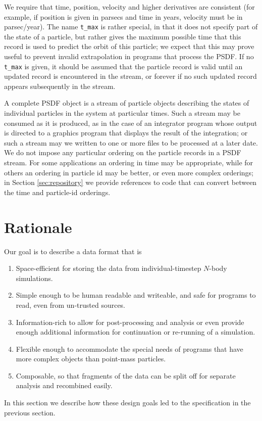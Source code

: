 \documentclass[5p,authoryear]{elsarticle}
\begin{document}
We require that time, position, velocity and higher derivatives are
consistent (for example, if position is given in parsecs and time in
years, velocity must be in parsec/year).  The name {\tt t\_max} is
rather special, in that it does not specify part of the state of a
particle, but rather gives the maximum possible time that this record
is used to predict the orbit of this particle; we expect that this may
prove useful to prevent invalid extrapolation in programs that process
the PSDF.  If no {\tt t\_max} is given, it should be assumed that the
particle record is valid until an updated record is encountered in the
stream, or forever if no such updated record appears subsequently in
the stream.



A complete PSDF object is a stream of particle objects describing the
states of individual particles in the system at particular times.
Such a stream may be consumed as it is produced, as in the case of an
integrator program whose output is directed to a graphics program that
displays the result of the integration; or such a stream may we
written to one or more files to be processed at a later date.  We do
not impose any particular ordering on the particle records in a PSDF
stream.  For some applications an ordering in time may be appropriate,
while for others an ordering in particle id may be better, or even
more complex orderings; in Section \ref{sec:repository} we provide
references to code that can convert between the time and particle-id
orderings.

\section{Rationale}

Our goal is to describe a data format that is 
\begin{enumerate}
\item Space-efficient for storing the data from individual-timestep
  $N$-body simulations.
\item Simple enough to be human readable and writeable, and safe for
  programs to read, even from un-trusted sources.
\item Information-rich to allow for post-processing and analysis or
  even provide enough additional information for continuation or
  re-running of a simulation.
\item Flexible enough to accommodate the special needs of programs
  that have more complex objects than point-mass particles.
\item Composable, so that fragments of the data can be split off for
  separate analysis and recombined easily.
\end{enumerate}
In this section we describe how these design goals led to the
specification in the previous section.
\end{document}
